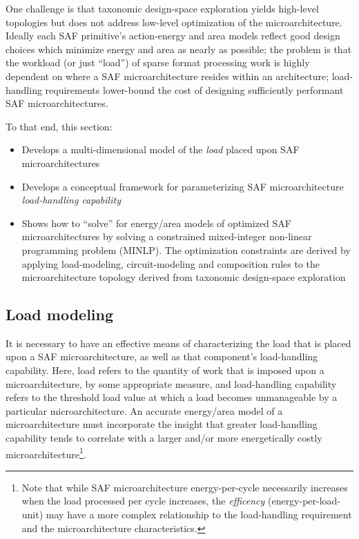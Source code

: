 One challenge is that taxonomic design-space exploration yields high-level topologies but does not address low-level optimization of the microarchitecture. Ideally each SAF primitive's action-energy and area models reflect good design choices which minimize energy and area as nearly as possible; the problem is that the workload (or just ``load'') of sparse format processing work is highly dependent on where a SAF microarchitecture resides within an architecture; load-handling requirements lower-bound the cost of designing sufficiently performant SAF microarchitectures.

To that end, this section:

\begin{itemize}
    \item Develops a multi-dimensional model of the \textit{load} placed upon SAF microarchitectures
    \item Develops a conceptual framework for parameterizing SAF microarchitecture \textit{load-handling capability}
    \item Shows how to ``solve'' for energy/area models of optimized SAF microarchitectures by solving a constrained mixed-integer non-linear programming problem (MINLP). The optimization constraints are derived by applying load-modeling, circuit-modeling and composition rules to the microarchitecture topology derived from taxonomic design-space exploration
\end{itemize}

\subsection{Load modeling}

It is necessary to have an effective means of characterizing the load that is placed upon a SAF microarchitecture, as well as that component's load-handling capability. Here, load refers to the quantity of work that is imposed upon a microarchitecture, by some appropriate measure, and load-handling capability refers to the threshold load value at which a load becomes unmanageable by a particular microarchitecture. An accurate energy/area model of a microarchitecture must incorporate the insight that greater load-handling capability tends to correlate with a larger and/or more energetically costly microarchitecture\footnote{Note that while SAF microarchitecture energy-per-cycle necessarily increases when the load processed per cycle increases, the \textit{efficency} (energy-per-load-unit) may have a more complex relationship to the load-handling requirement and the microarchitecture characteristics.}.

